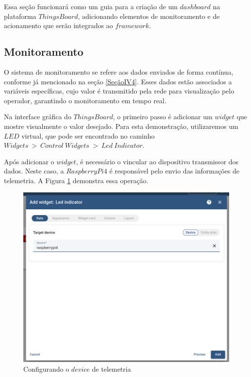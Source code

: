 \documentclass{ecatfg}
\begin{document}
Essa seção funcionará como um guia para a criação de um $dashboard$ na plataforma $ThingsBoard$, adicionando elementos de monitoramento e de acionamento que serão integrados ao $framework$.\par

\subsection{Monitoramento}
O sistema de monitoramento se refere aos dados enviados de forma contínua, conforme já mencionado na seção \ref{SeçãoIV4}. Esses dados estão associados a variáveis específicas, cujo valor é transmitido pela rede para visualização pelo operador, garantindo o monitoramento em tempo real. \par

Na interface gráfica do $ThingsBoard$, o primeiro passo é adicionar um $widget$ que mostre visualmente o valor desejado. Para esta demonstração, utilizaremos um $LED$ virtual, que pode ser encontrado no caminho $Widgets\ >\ Control\ Widgets\ >\ Led\ Indicator$. \par

Após adicionar o $widget$, é necessário o vincular ao dispositivo transmissor dos dados. Neste caso, a $RaspberryPi4$ é responsável pelo envio das informações de telemetria. A Figura \ref{fig:7} demonstra essa operação. \par

\begin{figure}[!htb]
    \centering
    \includegraphics[scale=0.2]{Figuras/selecionando_device_thingsboard.png}
    \caption{Configurando o $device$ de telemetria}
    \label{fig:7}
\end{figure}
\end{document}
